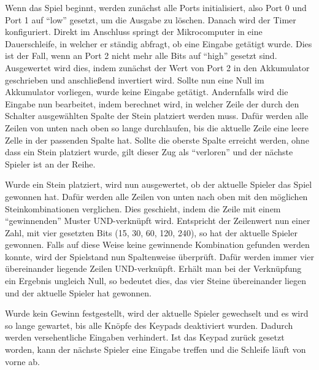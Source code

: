 Wenn das Spiel beginnt, werden zunächst alle Ports initialisiert, also Port 0 und Port 1 auf \enquote{low} gesetzt, um die Ausgabe zu löschen.
Danach wird der Timer konfiguriert.
Direkt im Anschluss springt der Mikrocomputer in eine Dauerschleife, in welcher er ständig abfragt, ob eine Eingabe getätigt wurde.
Dies ist der Fall, wenn an Port 2 nicht mehr alle Bits auf \enquote{high} gesetzt sind. 
Ausgewertet wird dies, indem zunächst der Wert von Port 2 in den Akkumulator geschrieben und anschließend invertiert wird. Sollte nun eine Null im Akkumulator vorliegen, wurde keine Eingabe getätigt.
Andernfalls wird die Eingabe nun bearbeitet, indem berechnet wird, in welcher Zeile der durch den Schalter ausgewählten Spalte der Stein platziert werden muss. Dafür werden alle Zeilen von unten nach oben so lange durchlaufen, bis die aktuelle Zeile eine leere Zelle in der passenden Spalte hat. Sollte die oberste Spalte erreicht werden, ohne dass ein Stein platziert wurde, gilt dieser Zug als \enquote{verloren} und der nächste Spieler ist an der Reihe.

Wurde ein Stein platziert, wird nun ausgewertet, ob der aktuelle Spieler das Spiel gewonnen hat. Dafür werden alle Zeilen von unten nach oben mit den möglichen Steinkombinationen verglichen. Dies geschieht, indem die Zeile mit einem \enquote{gewinnenden} Muster UND-verknüpft wird. Entspricht der Zeilenwert nun einer Zahl, mit vier gesetzten Bits (15, 30, 60, 120, 240), so hat der aktuelle Spieler gewonnen.
Falls auf diese Weise keine gewinnende Kombination gefunden werden konnte, wird der Spielstand nun Spaltenweise überprüft. Dafür werden immer vier übereinander liegende Zeilen UND-verknüpft. Erhält man bei der Verknüpfung ein Ergebnis ungleich Null, so bedeutet dies, das vier Steine übereinander liegen und der aktuelle Spieler hat gewonnen.

Wurde kein Gewinn festgestellt, wird der aktuelle Spieler gewechselt und es wird so lange gewartet, bis alle Knöpfe des Keypads deaktiviert wurden. Dadurch werden versehentliche Eingaben verhindert. 
Ist das Keypad zurück gesetzt worden, kann der nächste Spieler eine Eingabe treffen und die Schleife läuft von vorne ab.

